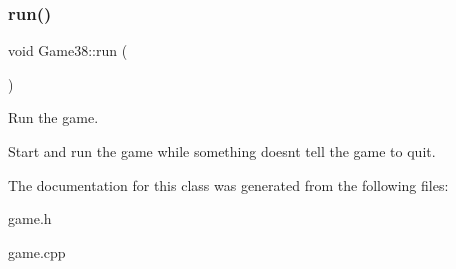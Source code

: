 \subsubsection{\texorpdfstring{run()}{run()}}
{\footnotesize\ttfamily void Game38\+::run (\begin{DoxyParamCaption}{ }\end{DoxyParamCaption})}



Run the game. 

Start and run the game while something doesn\textquotesingle{}t tell the game to quit. 

The documentation for this class was generated from the following files\+:\begin{DoxyCompactItemize}
\item 
game.\+h\item 
game.\+cpp\end{DoxyCompactItemize}
